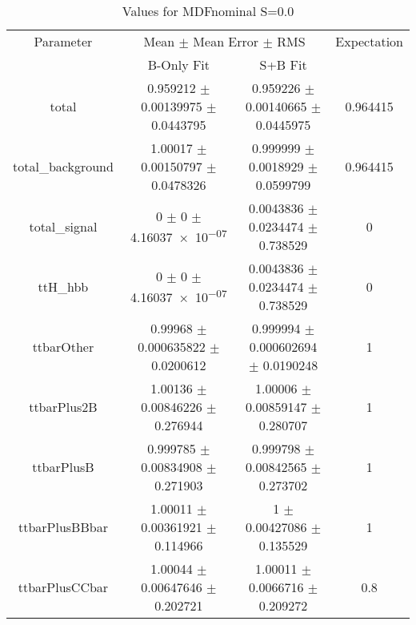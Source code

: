 \begin{table}
\centering
\caption{Values for MDFnominal S=0.0}
\begin{tabular}{cccc}
\toprule
Parameter & \multicolumn{2}{c}{Mean $\pm$ Mean Error $\pm$ RMS} & Expectation\\
 & B-Only Fit & S+B Fit & \\
\midrule
total & \num{0.959212} $\pm$ \num{0.00139975} $\pm$ \num{0.0443795} & \num{0.959226} $\pm$ \num{0.00140665} $\pm$ \num{0.0445975} & \num{0.964415}\\
total\_background & \num{1.00017} $\pm$ \num{0.00150797} $\pm$ \num{0.0478326} & \num{0.999999} $\pm$ \num{0.0018929} $\pm$ \num{0.0599799} & \num{0.964415}\\
total\_signal & \num{0} $\pm$ \num{0} $\pm$ \num{4.16037e-07} & \num{0.0043836} $\pm$ \num{0.0234474} $\pm$ \num{0.738529} & \num{0}\\
ttH\_hbb & \num{0} $\pm$ \num{0} $\pm$ \num{4.16037e-07} & \num{0.0043836} $\pm$ \num{0.0234474} $\pm$ \num{0.738529} & \num{0}\\
ttbarOther & \num{0.99968} $\pm$ \num{0.000635822} $\pm$ \num{0.0200612} & \num{0.999994} $\pm$ \num{0.000602694} $\pm$ \num{0.0190248} & \num{1}\\
ttbarPlus2B & \num{1.00136} $\pm$ \num{0.00846226} $\pm$ \num{0.276944} & \num{1.00006} $\pm$ \num{0.00859147} $\pm$ \num{0.280707} & \num{1}\\
ttbarPlusB & \num{0.999785} $\pm$ \num{0.00834908} $\pm$ \num{0.271903} & \num{0.999798} $\pm$ \num{0.00842565} $\pm$ \num{0.273702} & \num{1}\\
ttbarPlusBBbar & \num{1.00011} $\pm$ \num{0.00361921} $\pm$ \num{0.114966} & \num{1} $\pm$ \num{0.00427086} $\pm$ \num{0.135529} & \num{1}\\
ttbarPlusCCbar & \num{1.00044} $\pm$ \num{0.00647646} $\pm$ \num{0.202721} & \num{1.00011} $\pm$ \num{0.0066716} $\pm$ \num{0.209272} & \num{0.8}\\
\bottomrule
\end{tabular}
\end{table}